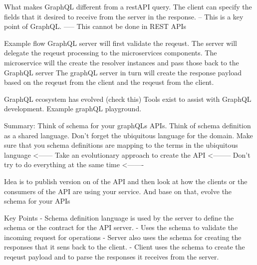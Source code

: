 What makes GraphQL different from a restAPI query.
The client can specify the fields that it desired to receive from the server in the response.
-- This is a key point of GraphQL.
----- This cannot be done in REST APIs

Example flow
GraphQL server will first validate the reqeust.
The server will delegate the reqeust processing to the microservices components.
The microservice will the create the resolver instances and pass those back to the GraphQL server
The graphQL server in turn will create the response payload based on the reqeust from the client and the reqeust from the client.

GraphQL ecosystem has evolved (check this)
Tools exist to assist with GraphQL development. Example graphQL playground.

Summary:
Think of schema for your graphQLs APIs.
Think of schema definition as a shared language.
Don't forget the ubiquitous language for the domain.
Make sure that you schema definitions are mapping to the terms in the ubiquitous language <------
Take an evolutionary approach to create the API <--------
Don't try to do everything at the same time <-------

Idea is to publish version on of the API and then look at how the clients or the consumers of the API are using your service.
And base on that, evolve the schema for your APIs

Key Points
- Schema definition language is used by the server to define the schema or the contract for the API server.
- Uses the schema to validate the incoming request for operations
- Server also uses the schema for creating the responses that it sens back to the client.
- Client uses the schema to create the reqeust payload and to parse the responses it receives from the server.

